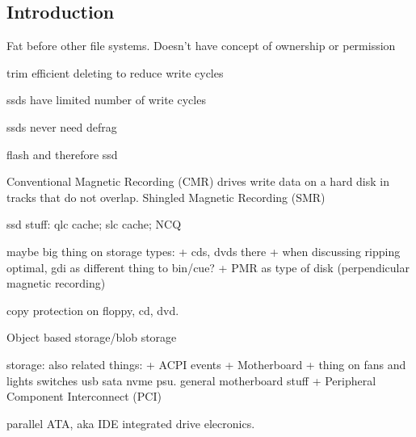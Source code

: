 
\subsection{Introduction}


Fat before other file systems. Doesn't have concept of ownership or permission



trim
	efficient deleting to reduce write cycles

ssds have limited number of write cycles

ssds never need defrag

flash and therefore ssd

Conventional Magnetic Recording (CMR) drives write data on a hard disk in tracks that do not overlap. Shingled Magnetic Recording (SMR)

ssd stuff:  qlc cache; slc cache; NCQ

maybe big thing on storage types:
+ cds, dvds there
+ when discussing ripping optimal, gdi as different thing to bin/cue?
+ PMR as type of disk (perpendicular magnetic recording)

copy protection on floppy, cd, dvd.

Object based storage/blob storage

storage: also related things:
+ ACPI events
+ Motherboard
+ thing on fans and lights switches usb sata nvme psu. general motherboard stuff
+ Peripheral Component Interconnect (PCI)


parallel ATA, aka IDE integrated drive elecronics.


